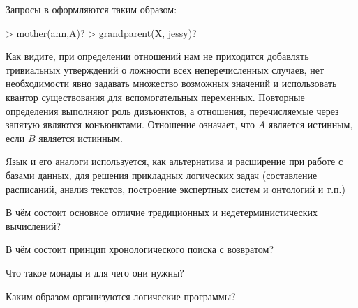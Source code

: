 Запросы в  оформляются таким образом:

\begin{SchemeCode}
  > mother(ann,A)?
  > grandparent(X, jessy)?
\end{SchemeCode}


Как видите, при определении отношений нам не приходится добавлять тривиальных утверждений о ложности всех неперечисленных случаев, нет необходимости явно задавать множество возможных значений и использовать квантор существования для вспомогательных переменных. Повторные определения выполняют роль дизъюнктов, а отношения, перечисляемые через запятую являются конъюнктами. Отношение   означает, что $A$ является истинным, если $B$ является истинным.

Язык  и его аналоги используется, как альтернатива и расширение  при работе с базами данных, для решения прикладных логических задач (составление расписаний, анализ текстов, построение экспертных систем и онтологий и т.п.)

\begin{Queeze}
 \item В чём состоит основное отличие традиционных и недетерминистических вычислений?
 \item В чём состоит принцип хронологического поиска с возвратом?
 \item Что такое монады и для чего они нужны? 
 \item Каким образом организуются логические программы?
\end{Queeze}
